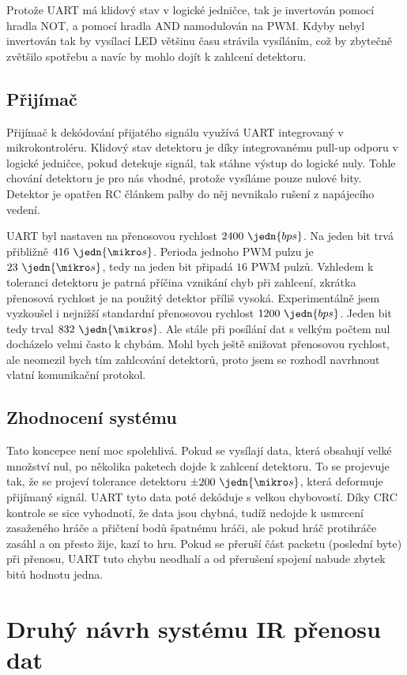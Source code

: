 Protože UART má klidový stav v logické jedničce, tak je invertován pomocí hradla NOT, a pomocí hradla AND namodulován na PWM. Kdyby nebyl invertován tak by vysílací LED většinu času strávila vysíláním, což by zbytečně zvětšilo spotřebu a navíc by mohlo dojít k zahlcení detektoru.

\subsection{Přijímač}
Přijímač k dekódování přijatého signálu využívá UART integrovaný v mikrokontroléru. Klidový stav detektoru je díky integrovanému pull-up odporu v logické jedničce, pokud detekuje signál, tak stáhne výstup do logické nuly. Tohle chování detektoru je pro nás vhodné, protože vysíláme pouze nulové bity. Detektor je opatřen RC článkem palby do něj nevnikalo rušení z napájecího vedení.

UART byl nastaven na přenosovou rychlost $2400~\jedn{bps}$. Na jeden bit trvá přibližně $416~\jedn{\mikro s}$. Perioda jednoho PWM pulzu je $23~\jedn{\mikro s}$, tedy na jeden bit připadá $16$ PWM pulzů. Vzhledem k toleranci detektoru je patrná příčina vznikání chyb při zahlcení, zkrátka přenosová rychlost je na použitý detektor příliš vysoká. Experimentálně jsem vyzkoušel i nejnižší standardní přenosovou rychlost $1200~\jedn{bps}$. Jeden bit tedy trval $832~\jedn{\mikro s}$. Ale stále při posílání dat s velkým počtem nul docházelo velmi často k chybám. Mohl bych ještě snižovat přenosovou rychlost, ale neomezil bych tím zahlcování detektorů, proto jsem se rozhodl navrhnout vlatní komunikační protokol.

\subsection{Zhodnocení systému}
Tato koncepce není moc spolehlivá. Pokud se vysílají data, která obsahují velké množství nul, po několika paketech dojde k zahlcení detektoru. To se projevuje tak, že se projeví tolerance detektoru $\pm200~\jedn{\mikro s}$, která deformuje přijímaný signál. UART tyto data poté dekóduje s velkou chybovostí. Díky CRC kontrole se sice vyhodnotí, že data jsou chybná, tudíž nedojde k usmrcení zasaženého hráče a přičtení bodů špatnému hráči, ale pokud hráč protihráče zasáhl a on přesto žije, kazí to hru. Pokud se přeruší část packetu (poslední byte) při přenosu, UART tuto chybu neodhalí a od přerušení spojení nabude zbytek bitů hodnotu jedna.


\section{Druhý návrh systému IR přenosu dat}

